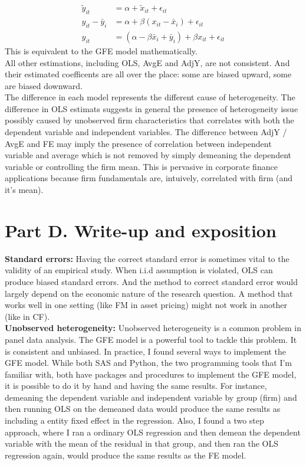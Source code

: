 \documentclass{article}
\begin{document}
\begin{align}
    \tilde{y}_{it}     & = \alpha + \tilde{x}_{it} + \epsilon_{it}                               \\
    y_{it} - \bar{y}_i & = \alpha + \beta (x_{it} - \bar{x}_i) + \epsilon_{it}                   \\
    y_{it}             & = (\alpha - \beta \bar{x}_i + \bar{y}_i) + \beta x_{it} + \epsilon_{it}
\end{align}
This is equivalent to the GFE model mathematically. \\
All other estimations, including OLS, AvgE and AdjY, are not consistent. And their estimated coefficents are all over the place: some are biased upward, some are biased downward.\\
The difference in each model represents the different cause of heterogeneity. The difference in OLS estimats suggests in general the presence of heterogeneity issue possibly caused by unobserved firm characteristics that correlates with both the dependent variable and independent variables. The difference between AdjY / AvgE and FE may imply the presence of correlation between independent variable and average which is not removed by simply demeaning the dependent variable or controlling the firm mean. This is pervasive in corporate finance applications because firm fundamentals are, intuively, correlated with firm (and it's mean).

\section*{Part D. Write-up and exposition}
\textbf{Standard errors:} Having the correct standard error is sometimes vital to the validity of an empirical study. When i.i.d assumption is violated, OLS can produce biased standard errors. And the method to correct standard error would largely depend on the economic nature of the research question. A method that works well in one setting (like FM in asset pricing) might not work in another (like in CF). \\
\textbf{Unobserved heterogeneity:} Unobserved heterogeneity is a common problem in panel data analysis. The GFE model is a powerful tool to tackle this problem. It is consistent and unbiased.
In practice, I found several ways to implement the GFE model. While both SAS and Python, the two programming tools that I'm familiar with, both have packages and procedures to implement the GFE model, it is possible to do it by hand and having the same results. For instance, demeaning the dependent variable and independent variable by group (firm) and then running OLS on the demeaned data would produce the same results as including a entity fixed effect in the regression. Also, I found a two step approach, where I ran a ordinary OLS regression and then demean the dependent variable with the mean of the residual in that group, and then ran the OLS regression again, would produce the same results as the FE model.
\end{document}
